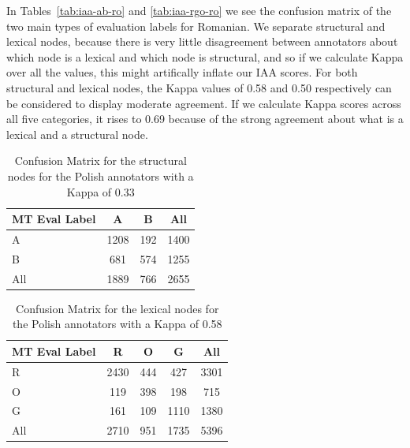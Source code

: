 \documentclass[11pt]{article}
\begin{document}
In Tables~\ref{tab:iaa-ab-ro} and \ref{tab:iaa-rgo-ro} we see the confusion matrix of
the two main types of evaluation labels for Romanian. We separate structural and lexical nodes, because
there is very little disagreement between annotators about which node is a lexical and which
node is structural, and so if we calculate Kappa over all the values, this might artifically 
inflate our IAA scores.
For both structural and lexical nodes, the Kappa values 
of 0.58 and 0.50 respectively 
can
be considered to display moderate agreement. 
If we calculate Kappa scores across all five categories, it rises to 
0.69 because of the strong agreement about what is a lexical and a structural 
node. 



\begin{table}[h!]
\begin{center}
      \begin{tabular}{|l|cc|c|}
      \hline
\bf{MT Eval Label} & \bf{A} & \bf{B} & \bf{All} \\
\hline                               
    A   & 1208 &  192 & 1400 \\ 
   B   & 681 & 574  & 1255 \\ 
   \hline
   All &  1889 &  766 & 2655 \\
      \hline
    \end{tabular}
\end{center}
\normalsize
\vspace*{-3ex}
\caption{Confusion Matrix for the structural nodes for the Polish annotators with a Kappa of 0.33
}
\label{tab:iaa-ab-pl}
\end{table}

\begin{table}[h!]
\begin{center}
      \begin{tabular}{|l|ccc|c|}
      \hline
\bf{MT Eval Label} & \bf{R} & \bf{O} & \bf{G} & \bf{All} \\
\hline                               
   R   & 2430 &  444 & 427 & 3301 \\ 
   O   & 119 & 398  & 198 & 715 \\ 
   G   & 161 & 109  & 1110 & 1380 \\ 
   \hline
   All &  2710 &  951 & 1735 & 5396 \\
      \hline
    \end{tabular}
\end{center}
\normalsize
\vspace*{-3ex}
\caption{Confusion Matrix for the lexical nodes for the Polish annotators with a Kappa of 0.58
}
\label{tab:iaa-rgo-pl}
\end{table}
\end{document}
